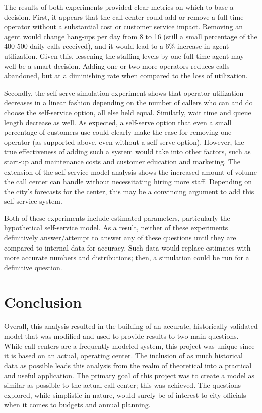 \documentclass[12pt,twocolumn]{article}
\begin{document}
The results of both experiments provided clear metrics on which to base a decision.  First, it appears that the call center could add or remove a full-time operator without a substantial cost or customer service impact.  Removing an agent would change hang-ups per day from 8 to 16 (still a small percentage of the 400-500 daily calls received), and it would lead to a 6\% increase in agent utilization.  Given this, lessening the staffing levels by one full-time agent may well be a smart decision.  Adding one or two more operators reduces calls abandoned, but at a diminishing rate when compared to the loss of utilization.

\par

Secondly, the self-serve simulation experiment shows that operator utilization decreases in a linear fashion depending on the number of callers who can and do choose the self-service option, all else held equal.  Similarly, wait time and queue length decrease as well.  As expected, a self-serve option that even a small percentage of customers use could clearly make the case for removing one operator (as supported above, even without a self-serve option).  However, the true effectiveness of adding such a system would take into other factors, such as start-up and maintenance costs and customer education and marketing.  The extension of the self-service model analysis shows the increased amount of volume the call center can handle without necessitating hiring more staff.  Depending on the city's forecasts for the center, this may be a convincing argument to add this self-service system.

\par

Both of these experiments include estimated parameters, particularly the hypothetical self-service model.  As a result, neither of these experiments definitively answer/attempt to answer any of these questions until they are compared to internal data for accuracy.  Such data would replace estimates with more accurate numbers and distributions; then, a simulation could be run for a definitive question.


\section{Conclusion}

Overall, this analysis resulted in the building of an accurate, historically validated model that was modified and used to provide results to two main questions.  While call centers are a frequently modeled system, this project was unique since it is based on an actual, operating center.  The inclusion of as much historical data as possible leads this analysis from the realm of theoretical into a practical and useful application.  The primary goal of this project was to create a model as similar as possible to the actual call center; this was achieved.  The questions explored, while simplistic in nature, would surely be of interest to city officials when it comes to budgets and annual planning.
\end{document}
